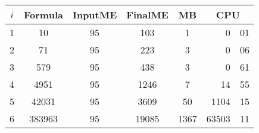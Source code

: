 \begin{tabular}{|c|c|c|c|c|r@{.}l|} \hline
$i$ & Formula & InputME & FinalME & MB & \multicolumn{2}{c|}{CPU}\\
\hline 
1 & 10 & 95 & 103 & 1 & 0&01\\
2 & 71 & 95 & 223 & 3 & 0&06\\
3 & 579 & 95 & 438 & 3 & 0&61\\
4 & 4951 & 95 & 1246 & 7 & 14&55\\
5 & 42031 & 95 & 3609 & 50 & 1104&15\\
6 & 383963 & 95 & 19085 & 1367 & 63503&11\\
\hline
\end{tabular}
